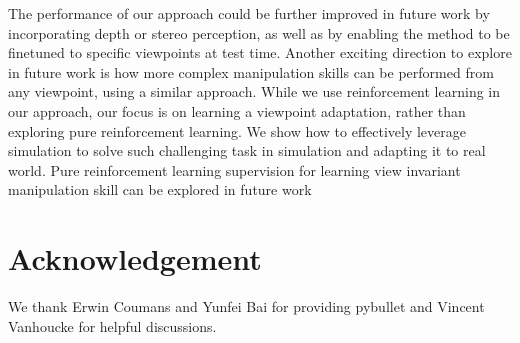 \documentclass[10pt,twocolumn,letterpaper]{article}
\begin{document}
The performance of our approach could be further improved in future work by incorporating depth or stereo perception, as well as by enabling the method to be finetuned to specific viewpoints at test time. Another exciting direction to explore in future work is how more complex manipulation skills can be performed from any viewpoint, using a similar approach. While we use reinforcement learning in our approach, our focus is on learning a viewpoint adaptation, rather than exploring pure reinforcement learning. We show how to effectively leverage simulation to solve such challenging task in simulation and adapting it to real world. Pure reinforcement learning supervision for learning view invariant manipulation skill can be explored in future work




\section*{Acknowledgement}
We thank Erwin Coumans and Yunfei Bai for providing pybullet and Vincent Vanhoucke for helpful discussions.

{\small


}
\end{document}
